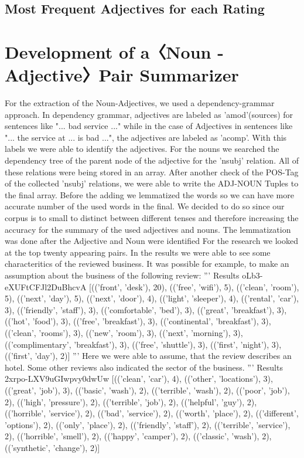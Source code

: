 \documentclass[sigchi]{acmart}
\begin{document}
	\subsection{Most Frequent Adjectives for each Rating}
	\section{Development of a〈Noun - Adjective〉Pair Summarizer}
	For the extraction of the Noun-Adjectives, we used a dependency-grammar approach. In dependency grammar, adjectives are labeled as 'amod'(sources) for sentences like "... bad service ..." while in the case of Adjectives in sentences like "... the service at ... is bad ...", the adjectives are labeled as 'acomp'. With this labels we were able to identify the adjectives. For the nouns we searched the dependency tree of the parent node of the adjective for 
	the 'nsubj' relation. All of these relations were being stored in an array. After another check of the POS-Tag of the collected 'nsubj' relations, we were able to write the ADJ-NOUN Tuples to the final array. Before the adding we lemmatized the words so we can have more accurate number of the used words in the final. We decided to do so since our corpus is to small to distinct between different tenses and therefore increasing the accuracy for the summary of the used adjectives and nouns. The lemmatization was done after the Adjective and Noun were identified For the research we looked at the top twenty appearing pairs.
	In the results we were able to see some characteritics of the reviewed business. It  was possible for example, to make an assumption about the business of the following review:
	'''
	Results oLb3-eXUFtCFJl2DuBhcvA
	[(('front', 'desk'), 20), (('free', 'wifi'), 5), (('clean', 'room'), 5), (('next', 'day'), 5), (('next', 'door'), 4), (('light', 'sleeper'), 4), (('rental', 'car'), 3), (('friendly', 'staff'), 3), (('comfortable', 'bed'), 3), (('great', 'breakfast'), 3), (('hot', 'food'), 3), (('free', 'breakfast'), 3), (('continental', 'breakfast'), 3), (('clean', 'rooms'), 3), (('new', 'room'), 3), (('next', 'morning'), 3), (('complimentary', 'breakfast'), 3), (('free', 'shuttle'), 3), (('first', 'night'), 3), (('first', 'day'), 2)]
	'''
	Here we were able to assume, that the review describes an hotel. Some other reviews also indicated the sector of the business. 
	'''
	Results 2xrpo-LXV9uGIwpvy0dwUw
	[(('clean', 'car'), 4), (('other', 'locations'), 3), (('great', 'job'), 3), (('basic', 'wash'), 2), (('terrible', 'wash'), 2), (('poor', 'job'), 2), (('high', 'pressure'), 2), (('terrible', 'job'), 2), (('helpful', 'guy'), 2), (('horrible', 'service'), 2), (('bad', 'service'), 2), (('worth', 'place'), 2), (('different', 'options'), 2), (('only', 'place'), 2), (('friendly', 'staff'), 2), (('terrible', 'service'), 2), (('horrible', 'smell'), 2), (('happy', 'camper'), 2), (('classic', 'wash'), 2), (('synthetic', 'change'), 2)]
\end{document}
